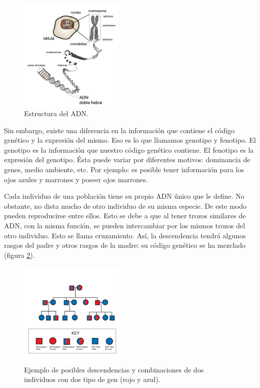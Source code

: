 \begin{figure}[t] \centering
\includegraphics[width=0.45\textwidth]{figs/adn}
\caption{Estructura del ADN.}
\label{fig:adn}
\end{figure}

Sin embargo, existe una diferencia en la información que contiene el código
genético y la expresión del mismo. Eso es lo que llamamos genotipo y fenotipo. El
genotipo es la  información que nuestro código genético contiene. El fenotipo es
la expresión del genotipo. Ésta puede variar por diferentes motivos: dominancia
de genes, medio ambiente, etc. Por ejemplo: es posible tener información para los
ojos azules y marrones y poseer ojos marrones.

Cada individuo de una población tiene su propio ADN único que le define.  No
obstante, no dista mucho de otro individuo de su misma especie. De este modo
pueden reproducirse entre ellos. Esto se debe a que al tener trozos similares de
ADN, con la misma función, se pueden intercambiar por los mismos trozos del otro
individuo. Esto se llama cruzamiento. Así, la descendencia tendrá algunos rasgos
del padre y otros rasgos de la madre: su código genético se ha mezclado
(figura \ref{fig:mendel}).

\begin{figure}[t]
\centering
\includegraphics[width=0.45\textwidth]{figs/mendel}
\caption{Ejemplo de posibles descendencias y combinaciones de dos individuos con
dos tipo de gen (rojo y azul).}
\label{fig:mendel}
\end{figure}

